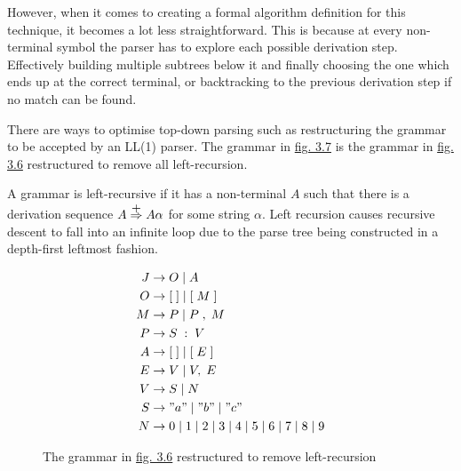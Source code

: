 However, when it comes to creating a formal algorithm definition for this technique, it becomes a lot less straightforward. This is because at every non-terminal symbol the parser has to explore each possible derivation step. Effectively building multiple subtrees below it and finally choosing the one which ends up at the correct terminal, or backtracking to the previous derivation step if no match can be found.

There are ways to optimise top-down parsing such as restructuring the grammar to be accepted by an LL(1) parser. The grammar in \hyperref[fig:3.7]{fig. 3.7} is the grammar in \hyperref[fig:3.6]{fig. 3.6} restructured to remove all left-recursion.

\begin{definition}
    A grammar is left-recursive if it has a non-terminal $A$ such that there is a derivation sequence $A \stackrel{\mathclap{\normalfont\mbox{+}}}{\Rightarrow} A \alpha$ for some string $\alpha$. Left recursion causes recursive descent to fall into an infinite loop due to the parse tree being constructed in a depth-first leftmost fashion.\textsuperscript{\cite{scott_johnstone_1998}}
\end{definition}

\begin{figure}[h]
    \begin{center}
        \begin{equation}
            \begin{split}
                J &\rightarrow O\;|\;A\\
                O &\rightarrow [\;]\;|\;[\;M\;]\\
                M &\rightarrow P\;|\;P\;,\;M\\
                P &\rightarrow S\;:\;V\\
                A &\rightarrow [\;]\;|\;[\;E\;]\\
                E &\rightarrow V\;|\;V,\;E\\
                V &\rightarrow	S\;|\;N\\
                S &\rightarrow	"a"\;|\;"b"\;|\;"c"\\
                N &\rightarrow 0\;|\;1\;|\;2\;|\;3\;|\;4\;|\;5\;|\;6\;|\;7\;|\;8\;|\;9
            \end{split}
            \nonumber
        \end{equation}
    \end{center}
    \vspace{-1em}
    \caption{\label{fig:3.7}The grammar in \hyperref[fig:3.6]{fig. 3.6} restructured to remove left-recursion}
\end{figure}

